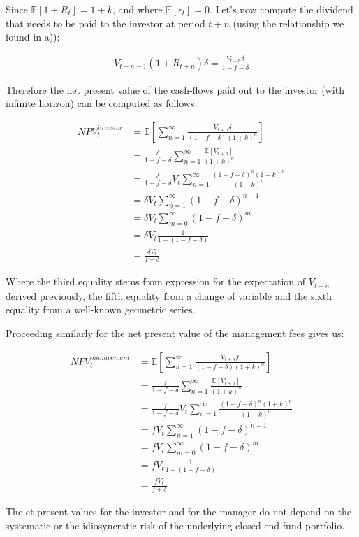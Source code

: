 \documentclass[10pt]{article}
\begin{document}
Since $\mathbb{E}[1 + R_t] = 1 + k$, and where $\mathbb{E}[\epsilon_t] = 0$. Let's now compute the dividend that needs to be paid to the investor at period $t+n$ (using the relationship we found in a)):

\begin{align*}
	V_{t+n-1}(1+R_{t+n})\delta = \frac{V_{t+n}\delta}{1 - f - \delta}
\end{align*}

Therefore the net present value of the cash-flows paid out to the investor (with infinite horizon) can be computed as follows:

\begin{align*}
	NPV^{investor}_t &= \mathbb{E}\left[ \sum^\infty_{n=1} \frac{V_{t+n}\delta}{(1 - f - \delta)(1+k)^n} \right]\\
	&=\frac{\delta}{1 - f - \delta}\sum^\infty_{n=1} \frac{\mathbb{E}[V_{t+n}]}{(1+k)^n}\\
	&= \frac{\delta}{1 - f - \delta}V_t \sum^\infty_{n=1} \frac{(1-f-\delta)^n(1+k)^n}{(1+k)^n}\\
	&= \delta V_t \sum^\infty_{n=1}(1-f-\delta)^{n-1}\\
	&= \delta V_t \sum^\infty_{m=0}(1-f-\delta)^{m}\\
	&= \delta V_t \frac{1}{1 - (1 - f - \delta)}\\
	&= \frac{\delta V_t}{f + \delta}
\end{align*}

Where the third equality stems from expression for the expectation of $V_{t+n}$ derived previously, the fifth equality from a change of variable and the sixth equality from a well-known geometric series.

\smallbreak

Proceeding similarly for the net present value of the management fees gives us:

\begin{align*}
		NPV^{management}_t &= \mathbb{E}\left[ \sum^\infty_{n=1} \frac{V_{t+n}f}{(1 - f - \delta)(1+k)^n} \right]\\
	&=\frac{f}{1 - f - \delta}\sum^\infty_{n=1} \frac{\mathbb{E}[V_{t+n}]}{(1+k)^n}\\
	&= \frac{f}{1 - f - \delta}V_t \sum^\infty_{n=1} \frac{(1-f-\delta)^n(1+k)^n}{(1+k)^n}\\
	&= f V_t \sum^\infty_{n=1}(1-f-\delta)^{n-1}\\
	&= f V_t \sum^\infty_{m=0}(1-f-\delta)^{m}\\
	&= f V_t \frac{1}{1 - (1 - f - \delta)}\\
	&= \frac{f V_t}{f + \delta}
\end{align*}

The et present values for the investor and for the manager do not depend on the systematic or the idiosyncratic risk of the underlying closed-end fund portfolio. 
\end{document}
